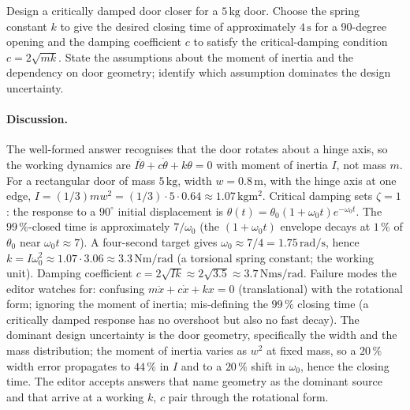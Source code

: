 \begin{exercise}
Design a critically damped door closer for a $5\,\si{\kilogram}$
door. Choose the spring constant $k$ to give the desired closing
time of approximately $4\,\si{\second}$ for a 90-degree opening
and the damping coefficient $c$ to satisfy the
critical-damping condition $c = 2\sqrt{m k}$. State the
assumptions about the moment of inertia and the dependency on
door geometry; identify which assumption dominates the design
uncertainty.

\paragraph{Discussion.} The well-formed answer recognises that
the door rotates about a hinge axis, so the working dynamics are
$I \ddot\theta + c \dot\theta + k \theta = 0$ with moment of
inertia $I$, not mass $m$. For a rectangular door of mass
$5\,\si{\kilogram}$, width $w = 0.8\,\si{\meter}$, with the
hinge axis at one edge, $I = (1/3) m w^{2} = (1/3) \cdot 5 \cdot
0.64 \approx 1.07\,\si{\kilogram\meter\squared}$. Critical
damping sets $\zeta = 1$: the response to a $90^{\circ}$ initial
displacement is $\theta(t) = \theta_{0}(1 + \omega_{0} t) e^{-
\omega_{0} t}$. The $99\,\%$-closed time is approximately $7/
\omega_{0}$ (the $(1 + \omega_{0} t)$ envelope decays at $1\,\%$
of $\theta_{0}$ near $\omega_{0} t \approx 7$). A four-second
target gives $\omega_{0} \approx 7/4 = 1.75\,\si{\radian\per
\second}$, hence $k = I \omega_{0}^{2} \approx 1.07 \cdot 3.06
\approx 3.3\,\si{\newton\meter\per\radian}$ (a torsional spring
constant; the working unit). Damping coefficient $c = 2 \sqrt{I
k} \approx 2 \sqrt{3.5} \approx 3.7\,\si{\newton\meter\second
\per\radian}$. Failure modes the editor watches for: confusing
$m \ddot{x} + c \dot{x} + k x = 0$ (translational) with the
rotational form; ignoring the moment of inertia; mis-defining
the $99\,\%$ closing time (a critically damped response has no
overshoot but also no fast decay). The dominant design
uncertainty is the door geometry, specifically the width and the
mass distribution; the moment of inertia varies as $w^{2}$ at
fixed mass, so a $20\,\%$ width error propagates to $44\,\%$ in
$I$ and to a $20\,\%$ shift in $\omega_{0}$, hence the closing
time. The editor accepts answers that name geometry as the
dominant source and that arrive at a working $k$, $c$ pair
through the rotational form.
\end{exercise}

